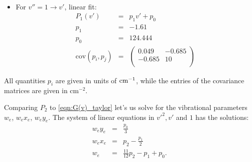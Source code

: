 \begin{itemize}
\begin{eqnarray}
        \end{eqnarray}
    \item For $v'' = 1 \rightarrow v'$, linear fit:
        \begin{eqnarray}
            P_1(v') &=& p_1 v' + p_0 \\
            p_1 &=& -1.61\\
            p_0 &=& 124.444 \\
            \mathrm{cov}(p_i, p_j) &=& 
            \begin{pmatrix}
                 0.049 & -0.685 \\
                 -0.685 & 10 \\
            \end{pmatrix}
        \end{eqnarray}
\end{itemize}
All quantities $p_i$ are given in units of $\mathrm{cm^{-1}}$, while the entries of the covariance 
matrices are given in $\mathrm{cm^{-2}}$.

Comparing $P_2$ to \eqref{eqn:G(v)_taylor} let's us solve for the vibrational 
parameters $w_e$, $w_e x_e$, $w_e y_e$. The system of linear equations in 
${v'}^2, v'$ and $1$ has the solutions:
\begin{eqnarray}
    w_e y_e &=& \frac{p_0}{3} \\
    w_e x_e &=& p_2 - \frac{p_1}{2} \\
    w_e &=& \frac{11}{12}p_2 - p_1 + p_0.
\end{eqnarray}















